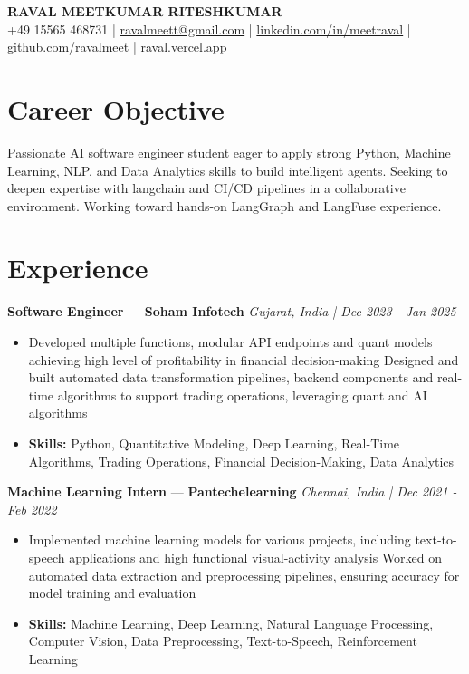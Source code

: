 \documentclass[a4paper,10pt]{article}
\begin{document}
\begin{center}
  {\Large\bfseries RAVAL MEETKUMAR RITESHKUMAR}\\[2pt]
  {\small +49 15565 468731 \;|\; \href{mailto:ravalmeett@gmail.com}{ravalmeett@gmail.com} \;|\; \href{https://www.linkedin.com/in/meetraval/}{linkedin.com/in/meetraval} \;|\; \href{https://github.com/ravalmeet}{github.com/ravalmeet} \;|\; \href{https://raval.vercel.app/}{raval.vercel.app}}
\end{center}
\vspace{-3pt}

\section*{Career Objective}
Passionate AI software engineer student eager to apply strong Python, Machine Learning, NLP, and Data Analytics skills to build intelligent agents. Seeking to deepen expertise with langchain and CI/CD pipelines in a collaborative environment. Working toward hands-on LangGraph and LangFuse experience.\par

\section*{Experience}
\textbf{Software Engineer} — \textbf{Soham Infotech} \hfill \textit{Gujarat, India \;|\; Dec 2023 - Jan 2025}\par
\vspace{1pt}
\begin{itemize}
  \item Developed multiple functions, modular API endpoints and quant models achieving high level of profitability in financial decision-making Designed and built automated data transformation pipelines, backend components and real-time algorithms to support trading operations, leveraging quant and AI algorithms
  \item \textbf{Skills:} Python, Quantitative Modeling, Deep Learning, Real-Time Algorithms, Trading Operations, Financial Decision-Making, Data Analytics
\end{itemize}
\vspace{3pt}
\textbf{Machine Learning Intern} — \textbf{Pantechelearning} \hfill \textit{Chennai, India \;|\; Dec 2021 - Feb 2022}\par
\vspace{1pt}
\begin{itemize}
  \item Implemented machine learning models for various projects, including text-to-speech applications and high functional visual-activity analysis Worked on automated data extraction and preprocessing pipelines, ensuring accuracy for model training and evaluation
  \item \textbf{Skills:} Machine Learning, Deep Learning, Natural Language Processing, Computer Vision, Data Preprocessing, Text-to-Speech, Reinforcement Learning
\end{itemize}
\end{document}

